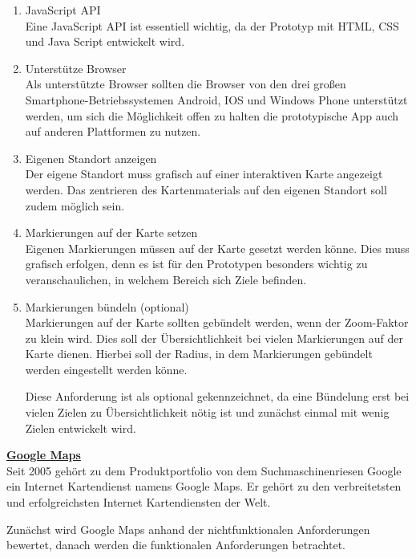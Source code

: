 \begin{enumerate}
\item JavaScript API\\
Eine JavaScript API ist essentiell wichtig, da der Prototyp mit HTML, CSS und Java Script entwickelt wird. 

\item Unterstütze Browser\\
Als unterstützte Browser sollten die Browser von den drei großen Smartphone-Betriebssystemen Android, IOS und Windows Phone unterstützt werden, um sich die Möglichkeit offen zu halten die prototypische App auch auf anderen Plattformen zu nutzen.

\item Eigenen Standort anzeigen\\
Der eigene Standort muss grafisch auf einer interaktiven Karte angezeigt werden. Das zentrieren des Kartenmaterials auf den eigenen Standort soll zudem möglich sein.

\item Markierungen auf der Karte setzen\\
Eigenen Markierungen müssen auf der Karte gesetzt werden könne. Dies muss grafisch erfolgen, denn es ist für den Prototypen besonders wichtig zu veranschaulichen, in welchem Bereich sich Ziele befinden. 

\item Markierungen bündeln (optional)\\
Markierungen auf der Karte sollten gebündelt werden, wenn der Zoom-Faktor zu klein wird. Dies soll der Übersichtlichkeit bei vielen Markierungen auf der Karte dienen. Hierbei soll der Radius, in dem Markierungen gebündelt werden eingestellt werden könne.

Diese Anforderung ist als optional gekennzeichnet, da eine Bündelung erst bei vielen Zielen zu Übersichtlichkeit nötig ist und zunächst einmal mit wenig Zielen entwickelt wird.

\end{enumerate}



\textbf{\underline{Google Maps}}\\
Seit 2005 gehört zu dem Produktportfolio von dem Suchmaschinenriesen Google ein Internet Kartendienst namens Google Maps. 
Er gehört zu den verbreitetsten und erfolgreichsten Internet Kartendiensten der Welt. \cite[Lexikon Google Maps]{itwissen}\cite[S.88]{gruber2015}

Zunächst wird Google Maps anhand der nichtfunktionalen Anforderungen bewertet, danach werden die funktionalen Anforderungen betrachtet.

